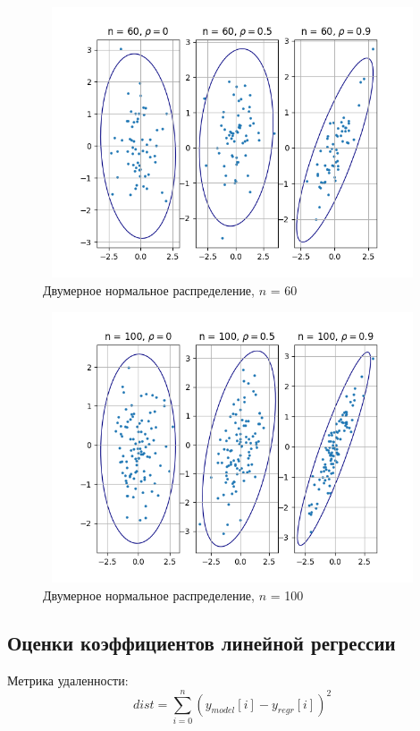 \begin{figure}[H]
	\centering
	\includegraphics[width = 13cm, height = 8cm]{resources/5_60.png}
	\caption{Двумерное нормальное распределение, $n$ = 60}
	\label{fig:n60}
\end{figure}

\begin{figure}[H]
	\centering
	\includegraphics[width = 13cm, height = 8cm]{resources/5_100.png}
	\caption{Двумерное нормальное распределение, $n$ = 100}
	\label{fig:n100}
\end{figure}
\subsection{Оценки коэффициентов линейной регрессии}

\noindent Метрика удаленности: 
\begin{equation} \label{eq:metric}
	dist = \sum_{i=0}^{n}(y_{model}[i]-y_{regr}[i])^2
\end{equation}


